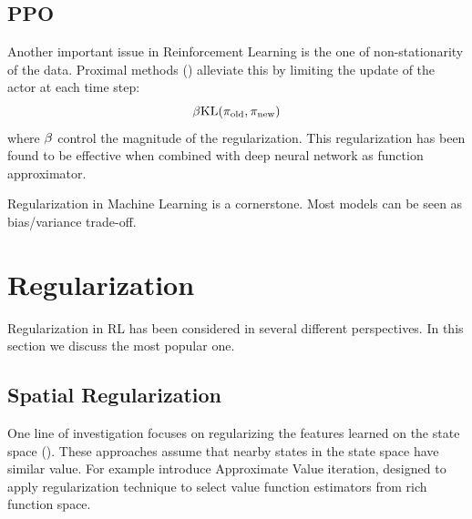 \subsection{PPO}
Another important issue in Reinforcement Learning is the one of non-stationarity of the data.
Proximal methods (\citep{schulman2017proximal,schulman2015trust}) alleviate this by limiting the update of the actor at each time step:
\begin{equation}
    \beta \text{KL}(\pi_{\text{old}},\pi_{\text{new}})
\end{equation}
where $\beta$ control the magnitude of the regularization. This regularization has been found to be effective when combined with deep neural network as function approximator.



Regularization in Machine Learning is a cornerstone. Most models can be seen as bias/variance trade-off.
\section{Regularization} %
Regularization in RL has been considered in several different perspectives. In this section we discuss the most popular one. 

\subsection{Spatial Regularization}
 One line of investigation focuses on regularizing the features learned on the state space (\citep{massoud2009regularized,petrik2010feature,pazis2011non,farahmand2011regularization,liu2012regularized,harrigan2016deep}). These approaches assume that nearby states in the state space have similar value. For example \citep{farahmand2011regularization} introduce Approximate Value iteration, designed to apply regularization technique to select value function estimators from rich function space.


